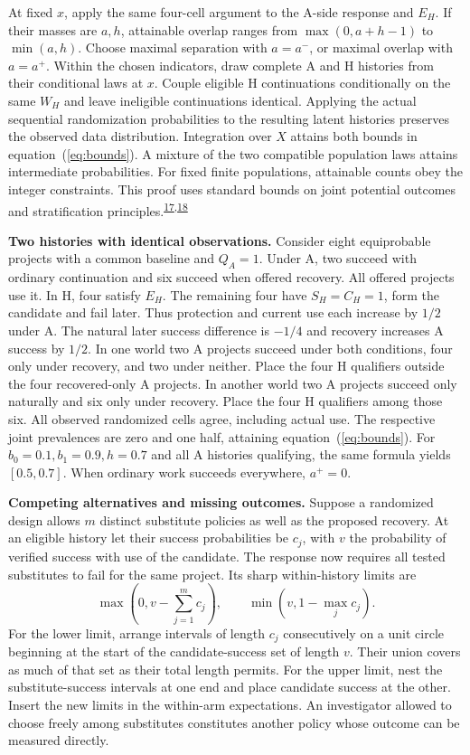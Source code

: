 \documentclass[11pt,a4paper]{article}
\newcommand{\lead}[1]{\textbf{#1}\enspace}
\begin{document}
At fixed $x$, apply the same four-cell argument to the A-side response and $E_H$. If their masses are $a,h$, attainable overlap ranges from $\max(0,a+h-1)$ to $\min(a,h)$. Choose maximal separation with $a=a^-$, or maximal overlap with $a=a^+$. Within the chosen indicators, draw complete A and H histories from their conditional laws at $x$. Couple eligible H continuations conditionally on the same $W_H$ and leave ineligible continuations identical. Applying the actual sequential randomization probabilities to the resulting latent histories preserves the observed data distribution. Integration over $X$ attains both bounds in equation~(\ref{eq:bounds}). A mixture of the two compatible population laws attains intermediate probabilities. For fixed finite populations, attainable counts obey the integer constraints. This proof uses standard bounds on joint potential outcomes and stratification principles.\textsuperscript{\href{https://doi.org/10.1023/A:1018912507879}{17},\href{https://doi.org/10.1111/j.0006-341X.2002.00021.x}{18}}

\lead{Two histories with identical observations.} Consider eight equiprobable projects with a common baseline and $Q_A=1$. Under A, two succeed with ordinary continuation and six succeed when offered recovery. All offered projects use it. In H, four satisfy $E_H$. The remaining four have $S_H=C_H=1$, form the candidate and fail later. Thus protection and current use each increase by $1/2$ under A. The natural later success difference is $-1/4$ and recovery increases A success by $1/2$. In one world two A projects succeed under both conditions, four only under recovery, and two under neither. Place the four H qualifiers outside the four recovered-only A projects. In another world two A projects succeed only naturally and six only under recovery. Place the four H qualifiers among those six. All observed randomized cells agree, including actual use. The respective joint prevalences are zero and one half, attaining equation~(\ref{eq:bounds}). For $b_0=0.1,b_1=0.9,h=0.7$ and all A histories qualifying, the same formula yields $[0.5,0.7]$. When ordinary work succeeds everywhere, $a^+=0$.

\lead{Competing alternatives and missing outcomes.} Suppose a randomized design allows $m$ distinct substitute policies as well as the proposed recovery. At an eligible history let their success probabilities be $c_j$, with $v$ the probability of verified success with use of the candidate. The response now requires all tested substitutes to fail for the same project. Its sharp within-history limits are
\begin{equation}
  \max(0,v-\textstyle\sum_{j=1}^m c_j),\qquad \min(v,1-\max_j c_j).
\end{equation}
For the lower limit, arrange intervals of length $c_j$ consecutively on a unit circle beginning at the start of the candidate-success set of length $v$. Their union covers as much of that set as their total length permits. For the upper limit, nest the substitute-success intervals at one end and place candidate success at the other. Insert the new limits in the within-arm expectations. An investigator allowed to choose freely among substitutes constitutes another policy whose outcome can be measured directly.
\end{document}
